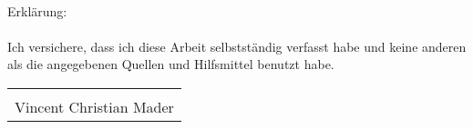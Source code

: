 \begin{titlepage}
    \ 
\end{titlepage}

\def\dotsign{\xleaders\hbox to .2em{\d{}}\hfill\d{}}

\begin{titlepage}
    Erklärung: \\
    \\
    Ich versichere, dass ich diese Arbeit selbstständig verfasst habe und keine anderen als die 
    angegebenen Quellen und Hilfsmittel benutzt habe. \\

    \vspace{25mm}
    \begin{tabular}{@{}p{2.5in}@{}}
    \hrulefill \\
    Vincent Christian Mader \\
    \end{tabular}

\end{titlepage}

